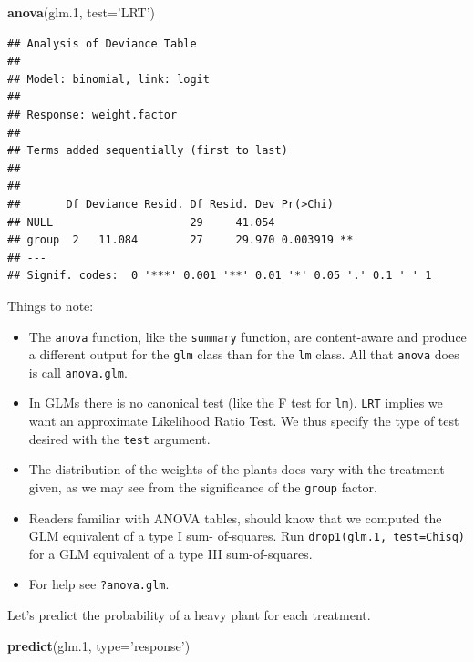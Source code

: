 \documentclass[]{book}
\newenvironment{Shaded}{\begin{snugshade}}{\end{snugshade}}
\newcommand{\KeywordTok}[1]{\textcolor[rgb]{0.13,0.29,0.53}{\textbf{#1}}}
\newcommand{\DataTypeTok}[1]{\textcolor[rgb]{0.13,0.29,0.53}{#1}}
\newcommand{\DecValTok}[1]{\textcolor[rgb]{0.00,0.00,0.81}{#1}}
\newcommand{\StringTok}[1]{\textcolor[rgb]{0.31,0.60,0.02}{#1}}
\newcommand{\NormalTok}[1]{#1}
\providecommand{\tightlist}{%
  \setlength{\itemsep}{0pt}\setlength{\parskip}{0pt}}
\theoremstyle{definition}
\theoremstyle{definition}
\theoremstyle{definition}
\theoremstyle{remark}
\begin{document}
\begin{Shaded}
\begin{Highlighting}[]
\KeywordTok{anova}\NormalTok{(glm.}\DecValTok{1}\NormalTok{, }\DataTypeTok{test=}\StringTok{'LRT'}\NormalTok{)}
\end{Highlighting}
\end{Shaded}

\begin{verbatim}
## Analysis of Deviance Table
## 
## Model: binomial, link: logit
## 
## Response: weight.factor
## 
## Terms added sequentially (first to last)
## 
## 
##       Df Deviance Resid. Df Resid. Dev Pr(>Chi)   
## NULL                     29     41.054            
## group  2   11.084        27     29.970 0.003919 **
## ---
## Signif. codes:  0 '***' 0.001 '**' 0.01 '*' 0.05 '.' 0.1 ' ' 1
\end{verbatim}

Things to note:

\begin{itemize}
\tightlist
\item
  The \texttt{anova} function, like the \texttt{summary} function, are
  content-aware and produce a different output for the \texttt{glm}
  class than for the \texttt{lm} class. All that \texttt{anova} does is
  call \texttt{anova.glm}.
\item
  In GLMs there is no canonical test (like the F test for \texttt{lm}).
  \texttt{LRT} implies we want an approximate Likelihood Ratio Test. We
  thus specify the type of test desired with the \texttt{test} argument.
\item
  The distribution of the weights of the plants does vary with the
  treatment given, as we may see from the significance of the
  \texttt{group} factor.
\item
  Readers familiar with ANOVA tables, should know that we computed the
  GLM equivalent of a type I sum- of-squares. Run
  \texttt{drop1(glm.1,\ test=\textquotesingle{}Chisq\textquotesingle{})}
  for a GLM equivalent of a type III sum-of-squares.
\item
  For help see \texttt{?anova.glm}.
\end{itemize}

Let's predict the probability of a heavy plant for each treatment.

\begin{Shaded}
\begin{Highlighting}[]
\KeywordTok{predict}\NormalTok{(glm.}\DecValTok{1}\NormalTok{, }\DataTypeTok{type=}\StringTok{'response'}\NormalTok{)}
\end{Highlighting}
\end{Shaded}
\end{document}
